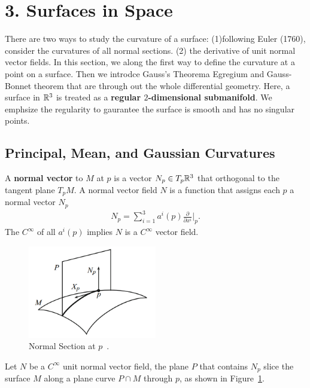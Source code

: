 
\section[Lecture 3--{Surfaces in Space}]{3. Surfaces in Space}
There are two ways to study the curvature of a surface: (1)following Euler (1760), consider
the curvatures of all normal sections. (2) the derivative of unit normal vector fields.
In this section, we along the first way to define the curvature at a point on a surface.
Then we introdce Gauss's Theorema Egregium and Gauss-Bonnet theorem that are through out the whole
differential geometry.
Here, a surface in ${\mathbb{R}}^3$ is treated as a \textbf{regular $2$-dimensional submanifold}.
We emphsize the regularity to gaurantee the surface is smooth and has no singular points.
\subsection{Principal, Mean, and Gaussian Curvatures}
A \textbf{normal vector} to $M$ at $p$ is a vector $N_p \in T_p {\mathbb{R}}^3$
that orthogonal to the tangent plane $T_p M$. A normal vector field $N$ is a function that assigns
each $p$ a normal vector $N_p$
\begin{align}
    N_p = \sum_{i=1}^{3}a^i(p)\frac{\partial}{\partial x^i}\Bigg| _p .\nonumber
\end{align}
The $C^\infty$ of all $a^i(p)$ implies $N$ is a $C^\infty$ vector field.
\begin{figure}
    \centering
    \includegraphics[width=0.5\textwidth]{../Lectures/Figures/norm_vector.png}
    \caption{Normal Section at $p$~\cite[p. 17]{tuDifferentialGeometry2017}.}
    \label{fig. norm vector}
\end{figure}
Let $N$ be a $C^\infty$ unit normal vector field, the plane $P$ that contains $N_p$ slice the
surface $M$ along a plane curve $P \cap M$ through $p$, as shown in Figure~\ref{fig. norm vector}.


